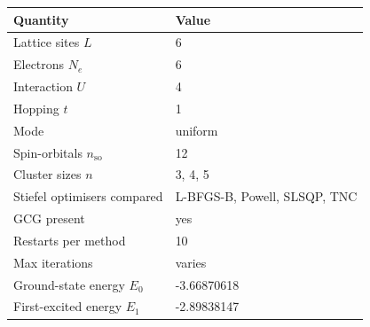 \begin{tabular}{ll}
\toprule
Quantity & Value \\
\midrule
Lattice sites $L$ & 6 \\
Electrons $N_e$ & 6 \\
Interaction $U$ & 4 \\
Hopping $t$ & 1 \\
Mode & uniform \\
Spin-orbitals $n_{\mathrm{so}}$ & 12 \\
Cluster sizes $n$ & 3, 4, 5 \\
Stiefel optimisers compared & L-BFGS-B, Powell, SLSQP, TNC \\
GCG present & yes \\
Restarts per method & 10 \\
Max iterations & varies \\
Ground-state energy $E_0$ & -3.66870618 \\
First-excited energy $E_1$ & -2.89838147 \\
\bottomrule
\end{tabular}